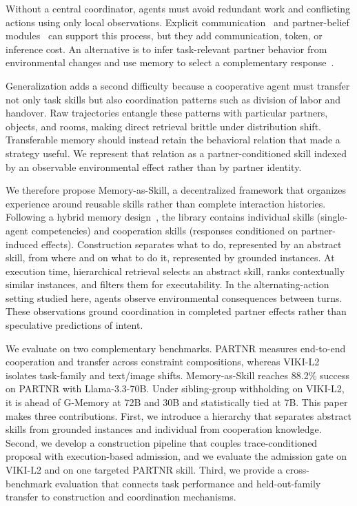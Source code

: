 \documentclass{article}
\theoremstyle{plain}
\theoremstyle{definition}
\theoremstyle{remark}
\begin{document}
Without a central coordinator, agents must avoid redundant work and conflicting actions using only local observations. Explicit communication~\citep{zhang2023building} and partner-belief modules~\citep{zhang2024proagent,li2023theory} can support this process, but they add communication, token, or inference cost. An alternative is to infer task-relevant partner behavior from environmental changes and use memory to select a complementary response~\citep{omidshafiei2017deep}.
 
Generalization adds a second difficulty because a cooperative agent must transfer not only task skills but also coordination patterns such as division of labor and handover. Raw trajectories entangle these patterns with particular partners, objects, and rooms, making direct retrieval brittle under distribution shift. Transferable memory should instead retain the behavioral relation that made a strategy useful. We represent that relation as a partner-conditioned skill indexed by an observable environmental effect rather than by partner identity.
 
 
We therefore propose Memory-as-Skill, a decentralized framework that organizes experience around reusable skills rather than complete interaction histories. Following a hybrid memory design~\citep{hu2025memory}, the library contains individual skills (single-agent competencies) and cooperation skills (responses conditioned on partner-induced effects). Construction separates what to do, represented by an abstract skill, from where and on what to do it, represented by grounded instances. At execution time, hierarchical retrieval selects an abstract skill, ranks contextually similar instances, and filters them for executability. In the alternating-action setting studied here, agents observe environmental consequences between turns. These observations ground coordination in completed partner effects rather than speculative predictions of intent.
 
We evaluate on two complementary benchmarks. PARTNR measures end-to-end cooperation and transfer across constraint compositions, whereas VIKI-L2 isolates task-family and text/image shifts. Memory-as-Skill reaches 88.2\% success on PARTNR with Llama-3.3-70B. Under sibling-group withholding on VIKI-L2, it is ahead of G-Memory at 72B and 30B and statistically tied at 7B. This paper makes three contributions. First, we introduce a hierarchy that separates abstract skills from grounded instances and individual from cooperation knowledge. Second, we develop a construction pipeline that couples trace-conditioned proposal with execution-based admission, and we evaluate the admission gate on VIKI-L2 and on one targeted PARTNR skill. Third, we provide a cross-benchmark evaluation that connects task performance and held-out-family transfer to construction and coordination mechanisms.
 
\end{document}
